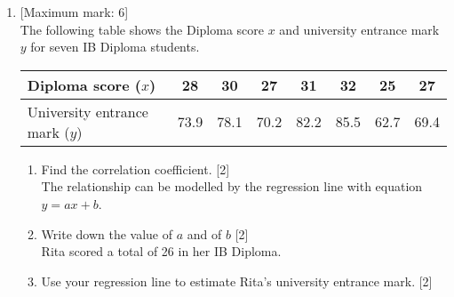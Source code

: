 \documentclass[12pt, twoside]{article}
\begin{document}
\begin{enumerate}
\newpage 
    \item {[Maximum mark: 6]} \\[0.3cm]
    The following table shows the Diploma score $x$ and university entrance mark $y$ for seven IB Diploma students. 
            \begin{center}
            \begin{tabular}{|l|c|c|c|c|c|c|c|}
                \hline
                Diploma score ($x$) & 28 & 30 & 27 & 31 & 32 & 25 & 27 \\ 
                \hline 
                University entrance mark ($y$) & 73.9 & 78.1 & 70.2 & 82.2 & 85.5 & 62.7 & 69.4 \\ 
                \hline 
                \end{tabular}
            \end{center}
            \begin{enumerate}
                \item Find the correlation coefficient. \hfill [2]\\[0.25cm]
                The relationship can be modelled by the regression line with equation $y=ax+b$.
                \item Write down the value of $a$ and of $b$ \hfill [2]\\[0.25cm]
                Rita scored a total of 26 in her IB Diploma.
                \item Use your regression line to estimate Rita's university entrance mark. \hfill [2]
            \end{enumerate}
            
\end{enumerate}
\end{document}
